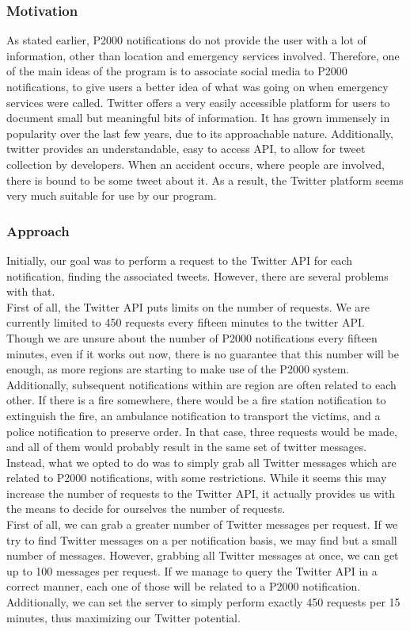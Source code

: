 \subsubsection*{Motivation}
As stated earlier, P2000 notifications do not provide the user with a lot of information, other than location and emergency services involved.
Therefore, one of the main ideas of the program is to associate social media to P2000 notifications, to give users a better idea of what was going on when emergency services were called.
Twitter offers a very easily accessible platform for users to document small but meaningful bits of information.
It has grown immensely in popularity over the last few years, due to its approachable nature.
Additionally, twitter provides an understandable, easy to access API, to allow for tweet collection by developers.
When an accident occurs, where people are involved, there is bound to be some tweet about it.
As a result, the Twitter platform seems very much suitable for use by our program.

\subsubsection*{Approach}
Initially, our goal was to perform a request to the Twitter API for each notification, finding the associated tweets.
However, there are several problems with that. \\
First of all, the Twitter API puts limits on the number of requests.
We are currently limited to 450 requests every fifteen minutes to the twitter API.
Though we are unsure about the number of P2000 notifications every fifteen minutes, even if it works out now, there is no guarantee that this number will be enough, as more regions are starting to make use of the P2000 system.
Additionally, subsequent notifications within are region are often related to each other.
If there is a fire somewhere, there would be a fire station notification to extinguish the fire, an ambulance notification to transport the victims, and a police notification to preserve order.
In that case, three requests would be made, and all of them would probably result in the same set of twitter messages. \\

Instead, what we opted to do was to simply grab all Twitter messages which are related to P2000 notifications, with some restrictions.
While it seems this may increase the number of requests to the Twitter API, it actually provides us with the means to decide for ourselves the number of requests. \\
First of all, we can grab a greater number of Twitter messages per request. 
If we try to find Twitter messages on a per notification basis, we may find but a small number of messages.
However, grabbing all Twitter messages at once, we can get up to 100 messages per request.
If we manage to query the Twitter API in a correct manner, each one of those will be related to a P2000 notification.
Additionally, we can set the server to simply perform exactly 450 requests per 15 minutes, thus maximizing our Twitter potential. \\

